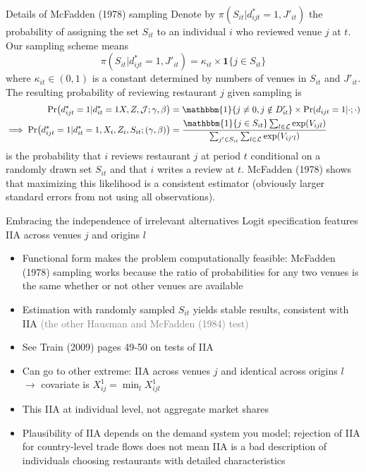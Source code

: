 \documentclass[11pt,notes=hide,aspectratio=169]{beamer}
\begin{document}
\begin{frame}{Details of McFadden (1978) sampling}
Denote by $\pi(S_{it}|d_{ijt}^{*}=1,J'_{it})$ the probability of assigning the set $S_{it}$ to an individual $i$ who reviewed venue $j$ at $t$. Our sampling scheme means
$$
\pi(S_{it}|d_{ijt}^{*}=1,J'_{it})
=
\kappa_{it} \times \mathbf{1}\{j\in S_{it}\}
$$
where $\kappa_{it}\in(0,1)$ is a constant determined by numbers of venues in  $S_{it}$ and $J'_{it}$.
The resulting probability of reviewing restaurant $j$ given sampling is
\begin{align*}
\Pr(d_{ijt}^{*}=1|d_{it}^{*}=1X,Z,\mathcal{J};\gamma,\beta)	
&=
\mathbbm{1}\{j\neq 0,j\notin D_{it}^{r}\} \times \Pr(d_{ijt}=1|\cdot;\cdot)
\\
\implies
\Pr(d_{ijt}^{*}=1|d_{it}^{*}=1,X_{i},Z_{i},S_{it};(\gamma,\beta))
&=
\frac{\mathbbm{1}\{j\in S_{it}\}\sum_{l\in\mathcal{L}}\exp(V_{ijl})}{\sum_{j'\in S_{it}}\sum_{l\in\mathcal{L}}\exp(V_{ij'l})}
\end{align*}
is the probability that $i$ reviews restaurant $j$ at period $t$ conditional on a randomly drawn set $S_{it}$ and that $i$ writes a review at $t$.
McFadden (1978) shows that maximizing this likelihood is a consistent estimator (obviously larger standard errors from not using all observations).
\end{frame}
\begin{frame}{Embracing the independence of irrelevant alternatives}
Logit specification features IIA across venues $j$ and origins $l$
\begin{itemize}
	\item Functional form makes the problem computationally feasible:
	McFadden (1978) sampling works because the ratio of probabilities for any two venues is the same whether or not other venues are available
	\item Estimation with randomly sampled $S_{it}$ yields stable results, consistent with IIA
	\textcolor{gray}{(the other Hausman and McFadden (1984) test)}
	\item See Train (2009) pages 49-50 on tests of IIA
	\item Can go to other extreme: IIA across venues $j$ and identical across origins $l$ $\to$ covariate is $X_{ij}^{1} = \min_{l} X_{ijl}^{1}$
	\item This IIA at individual level, not aggregate market shares
	\item Plausibility of IIA depends on the demand system you model;
	rejection of IIA for country-level trade flows does not mean IIA is a bad description of individuals choosing restaurants with detailed characteristics
\end{itemize}
\end{frame}
\end{document}
